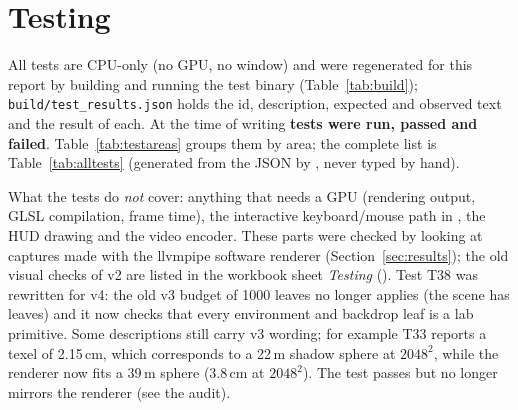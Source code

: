 \section{Testing}\label{sec:testing}
All tests are CPU-only (no GPU, no window) and were regenerated for this report by building and running the test binary
(Table~\ref{tab:build}); \texttt{build/test\_results.json} holds the id, description, expected and observed text and the result of each. At the time of
writing \textbf{\nTests{} tests were run, \nPass{} passed and \nFail{} failed}. Table~\ref{tab:testareas} groups them by area; the complete list is Table~\ref{tab:alltests}
(generated from the JSON by , never typed by hand).

\begin{table}[h]
\centering\small
\caption{Tests by area (generated).}
\label{tab:testareas}

\end{table}

What the tests do \emph{not} cover: anything that needs a GPU (rendering output, GLSL compilation, frame time), the interactive keyboard/mouse path in
, the HUD drawing and the video encoder. These parts were checked by looking at captures made with the llvmpipe software renderer (Section~\ref{sec:results}); the old visual checks of v2
are listed in the workbook sheet \emph{Testing} ().
Test T38 was rewritten for v4: the old v3 budget of 1000 leaves no longer applies (the scene has \nLeaves{} leaves) and it now checks that every environment and backdrop leaf is a lab primitive.
Some descriptions still carry v3 wording; for example T33 reports a texel of 2.15\,cm, which corresponds to a 22\,m shadow sphere at $2048^2$, while the renderer now fits a 39\,m sphere (3.8\,cm at $2048^2$). The test
passes but no longer mirrors the renderer (see the audit).


